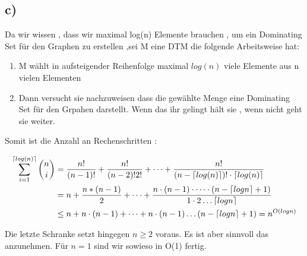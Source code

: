 \documentclass{article}
\def\mathify#1{\ifmmode{#1}\else\mbox{$#1$}\fi} %
\newcommand{\ceil}[1]{\mathify{\left\lceil {#1}\right\rceil}}
\begin{document}
		\subsection*{c)}
			Da wir wissen , dass wir maximal log(n) Elemente brauchen , um ein Dominating Set für den Graphen zu erstellen ,sei M eine DTM die folgende Arbeitsweise hat:

			\begin{enumerate}
				\item M wählt in aufsteigender Reihenfolge maximal $log(n)$ viele Elemente aus n vielen Elementen
				\item Dann versucht sie nachzuweisen dass die gewählte Menge eine Dominating Set für den Grpahen darstellt. Wenn das ihr gelingt hält sie , wenn nicht geht sie weiter.
			\end{enumerate}

			Somit ist die Anzahl an Rechenschritten :

			\begin{align*}
				\sum_{i=1}^{\ceil{log(n)}} \binom{n}{i} &= \frac{n!}{(n-1)!} + \frac{n!}{(n-2)!2!}+\cdots+\frac{n!}{(n-\ceil{log (n)})!\cdot \ceil{log(n)}} \\
				&= n + \frac{n * (n-1)}{2} + \dots + \frac{n \cdot (n-1) \cdot \dots \cdot (n- \ceil{log n}+1)}{1 \cdot 2 \dots \ceil{log n}} \\
				&\leq n + n\cdot (n-1) + \dots + n \cdot (n-1) \dots (n- \ceil{log n} +1) = n^{O(log n)} 
			\end{align*}

			Die letzte Schranke setzt hingegen $n \geq 2$ voraus. Es ist aber sinnvoll das anzunehmen.
			Für $n=1$ sind wir sowieso in O(1) fertig. 
			
\end{document}

